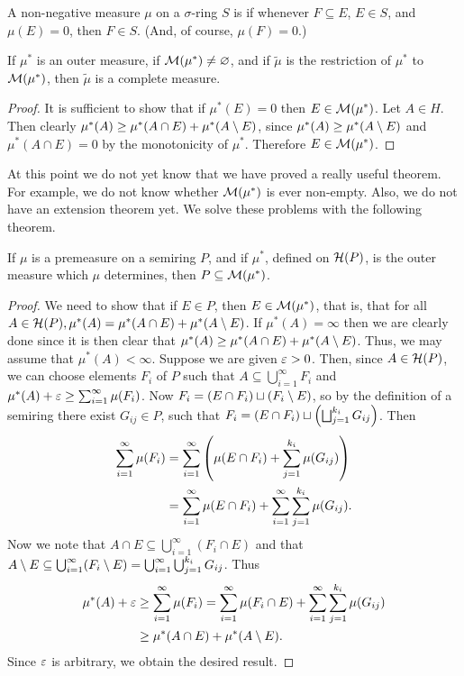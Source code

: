 \begin{definition}
A non-negative measure $\mu$ on a $\sigma$-ring $S$ is  if whenever $F\subseteq E$, $E\in S$, and $\mu(E)=0$, then $F\in S$. (And, of course, $\mu(F)=0$.)
\end{definition}

\begin{proposition}
If $\mu^*$ is an outer measure, if ${\cal M}(\mu^*)\neq\varnothing$, and if $\widetilde{\mu}$ is the restriction of $\mu^*$ to ${\cal M}(\mu^*)$, then $\widetilde{\mu}$ is a complete measure.
\end{proposition}

\begin{proof}
It is sufficient to show that if $\mu^*(E)=0$ then $E\in{\cal M}(\mu^*)$. Let $A\in H$. Then clearly $\mu^*(A)\geq\mu^*(A\cap E)+\mu^*(A\setminus E)$, since $\mu^*(A)\geq\mu^*(A\setminus E)$ and $\mu^*(A\cap E)=0$ by the monotonicity of $\mu^*$. Therefore $E\in{\cal M}(\mu^*)$.
\end{proof}

At this point we do not yet know that we have proved a really useful theorem. For example, we do not know whether ${\cal M}(\mu^*)$ is ever non-empty. Also, we do not have an extension theorem yet. We solve these problems with the following theorem.

\begin{theorem}
If $\mu$ is a premeasure on a semiring $P$, and if $\mu^*$, defined on ${\cal H}(P)$, is the outer measure which $\mu$ determines, then $P\subseteq{\cal M}(\mu^*)$.
\end{theorem}
\begin{proof}
We need to show that if $E\in P$, then $E\in{\cal M}(\mu^*)$, that is, that for all $A\in{\cal H}(P),\mu^*(A)=\mu^*(A\cap E)+\mu^*(A\setminus E)$. If $\mu^*(A)=\infty$ then we are clearly done since it is then clear that $\mu^*(A)\geq\mu^*(A\cap E)+\mu^*(A\setminus E)$. Thus, we may assume that $\mu^*(A)<\infty$. Suppose we are given $\varepsilon>0$. Then, since $A\in{\cal H}(P)$, we can choose elements $F_i$ of $P$ such that $A\subseteq\bigcup_{i=1}^\infty F_i$ and $\mu^*(A)+\varepsilon\geq\sum_{i=1}^\infty\mu(F_i)$. Now $F_i=(E\cap F_i)\sqcup(F_i\setminus E)$, so by the definition of a semiring there exist $G_{ij}\in P$, such that $F_i=(E\cap F_i)\sqcup\left(\bigsqcup_{j=1}^{k_i}G_{ij}\right)$. Then
\begin{align*}
\sum_{i=1}^\infty\mu(F_i)&=\sum_{i=1}^\infty\left(\mu(E\cap F_i)+\sum_{j=1}^{k_i}\mu(G_{i j})\right) \\
&=\sum_{i=1}^\infty\mu(E\cap F_i)+\sum_{i=1}^\infty\sum_{j=1}^{k_i}\mu(G_{i j}).
\end{align*}
Now we note that $A\cap E\subseteq\bigcup_{i=1}^\infty(F_i\cap E)$ and that $A\setminus E\subseteq\bigcup_{i=1}^\infty(F_i\setminus E)=\bigcup_{i=1}^\infty\bigcup_{j=1}^{k_i}G_{ij} $. Thus
\begin{align*}
    \mu^*(A)+\varepsilon&\geq\sum_{i=1}^\infty\mu(F_i)=\sum_{i=1}^\infty\mu(F_i\cap E)+\sum_{i=1}^\infty\sum_{j=1}^{k_i}\mu(G_{i j})\\
    &\geq\mu^*(A\cap E)+\mu^*(A\setminus E).
\end{align*}
Since $\varepsilon$ is arbitrary, we obtain the desired result.
\end{proof}

